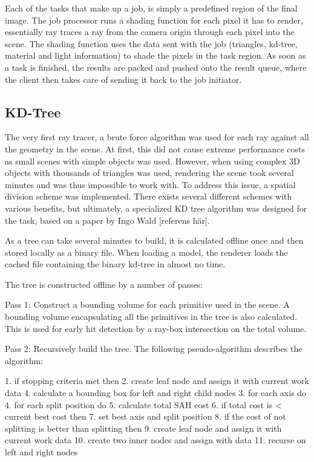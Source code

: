 Each of the tasks that make up a job, is simply a predefined region of the final image. The job processor runs a shading function for each pixel it has to render, essentially ray traces a ray from the camera origin through each pixel into the scene. The shading function uses the data sent with the job (triangles, kd-tree, material and light information) to shade the pixels in the task region. As soon as a task is finished, the results are packed and pushed onto the result queue, where the client then takes care of sending it back to the job initiator.

\subsection{KD-Tree}
The very first ray tracer, a brute force algorithm was used for each ray against all the geometry in the scene. At first, this did not cause extreme performance costs as small scenes with simple objects was used. However, when using complex 3D objects with thousands of triangles was used, rendering the scene took several minutes and was thus impossible to work with. To address this issue, a spatial division scheme was implemented. There exists several different schemes with various benefits, but ultimately, a specialized KD tree algorithm was designed for the task, based on a paper by Ingo Wald [referens här]. 

As a tree can take several minutes to build, it is calculated offline once and then stored locally as a binary file. When loading a model, the renderer loads the cached file containing the binary kd-tree in almost no time.

The tree is constructed offline by a number of passes:

Pass 1: Construct a bounding volume for each primitive used in the scene. A bounding volume encapsulating all the primitives in the tree is also calculated. This is used for early hit detection by a ray-box intersection on the total volume.

Pass 2: Recursively build the tree. The following pseudo-algorithm describes the algorithm:

 1. if stopping criteria met then 
 2.   create leaf node and assign it with current work data
 4. calculate a bounding box for left and right child nodes
 3. for each axis do
 4.  for each split position do
 5.    calculate total SAH cost
 6.    if total cost is < current best cost then
 7.      set best axis and split position
 8. if the cost of not splitting is better than splitting then
 9.   create leaf node and assign it with current work data
10. create two inner nodes and assign with data
11. recurse on left and right nodes

